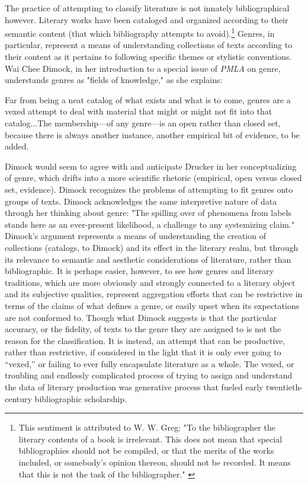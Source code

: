 The practice of attempting to classify literature is not innately bibliographical however. Literary works have been cataloged and organized according to their semantic content (that which bibliography attempts to avoid).\footnote{This sentiment is attributed to W. W. Greg: "To the bibliographer the literary contents of a book is irrelevant. This does not mean that special bibliographies should not be compiled, or that the merits of the works included, or somebody's opinion thereon, should not be recorded. It means that this is not the task of the bibliographer." \autocite[46]{greg_what_1913}} Genres, in particular, represent a means of understanding collections of texts according to their content as it pertains to following specific themes or stylistic conventions. Wai Chee Dimock, in her introduction to a special issue of \textit{PMLA} on genre, understands genres as "fields of knowledge," as she explains: 
\begin{displayquote}
Far from being a neat catalog of what exists and what is to come, genres are a vexed attempt to deal with material that might or might not fit into that catalog...The membership---of any genre---is an open rather than closed set, because there is always another instance, another empirical bit of evidence, to be added.\autocite[1378]{dimock_introduction:_2007}  
\end{displayquote}
Dimock would seem to agree with and anticipate Drucker in her conceptualizing of genre, which drifts into a more scientific rhetoric (empirical, open versus closed set, evidence). Dimock recognizes the problems of attempting to fit genres onto groups of texts. Dimock acknowledges the same interpretive nature of data through her thinking about genre: "The spilling over of phenomena from labels stands here as an ever-present likelihood, a challenge to any systemizing claim."\autocite[1378]{dimock_introduction:_2007} Dimock's argument represents a means of understanding the creation of collections (catalogs, to Dimock) and its effect in the literary realm, but through its relevance to semantic and aesthetic considerations of literature, rather than bibliographic. It is perhaps easier, however, to see how genres and literary traditions, which are more obviously and strongly connected to a literary object and its subjective qualities, represent aggregation efforts that can be restrictive in terms of the claims of what defines a genre, or easily upset when its expectations are not conformed to. Though what Dimock suggests is that the particular accuracy, or the fidelity, of texts to the genre they are assigned to is not the reason for the classification. It is instead, an attempt that can be productive, rather than restrictive, if considered in the light that it is only ever going to ``vexed,'' or failing to ever fully encapsulate literature as a whole. The vexed, or troubling and endlessly complicated process of trying to assign and understand the data of literary production was generative process that fueled early twentieth-century bibliographic scholarship.

